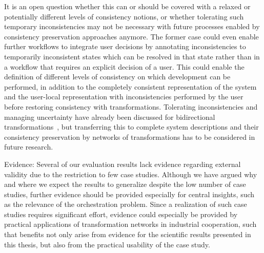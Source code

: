 \begin{properdescription}
It is an open question whether this can or should be covered with a relaxed or potentially different levels of consistency notions, or whether tolerating such temporary inconsistencies may not be necessary with future processes enabled by consistency preservation approaches anymore.
The former case could even enable further workflows to integrate user decisions by annotating inconsistencies to temporarily inconsistent states which can be resolved in that state rather than in a workflow that requires an explicit decision of a user.
This could enable the definition of different levels of consistency on which development can be performed, in addition to the completely consistent representation of the system and the user-local representation with inconsistencies performed by the user before restoring consistency with transformations.
Tolerating inconsistencies and managing uncertainty have already been discussed for bidirectional transformations~\cite{eramo2015uncertainty-SLE,stevens2014Partial-FASE,diskin2016UncertaintyBidirectionalTransformations-BX}, but transferring this to complete system descriptions and their consistency preservation by networks of transformations has to be considered in future research.
\item[Evidence:]
Several of our evaluation results lack evidence regarding external validity due to the restriction to few case studies.
Although we have argued why and where we expect the results to generalize despite the low number of case studies, further evidence should be provided especially for central insights, such as the relevance of the orchestration problem.
Since a realization of such case studies requires significant effort, evidence could especially be provided by practical applications of transformation networks in industrial cooperation, such that benefits not only arise from evidence for the scientific results presented in this thesis, but also from the practical usability of the case study.
\end{properdescription}





